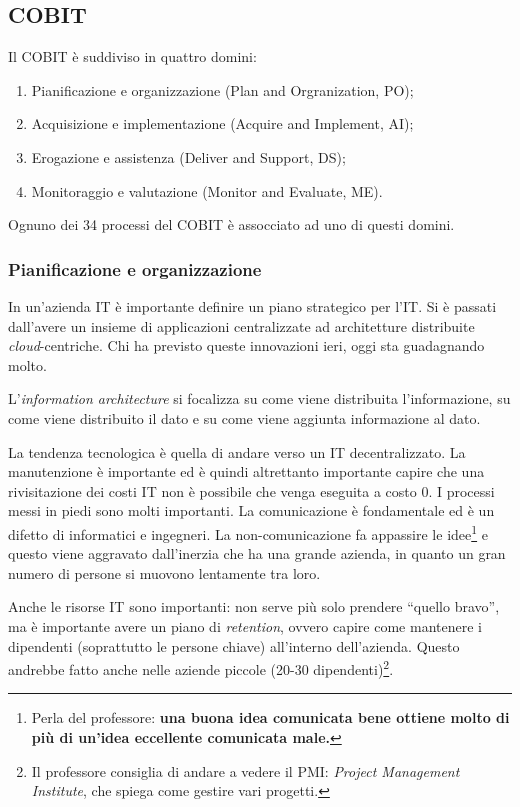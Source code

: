\subsection{COBIT}
\label{COBIT}

Il COBIT è suddiviso in quattro domini:
\begin{enumerate}
  \item Pianificazione e organizzazione (Plan and Orgranization, PO);
  \item Acquisizione e implementazione (Acquire and Implement, AI);
  \item Erogazione e assistenza (Deliver and Support, DS);
  \item Monitoraggio  e valutazione (Monitor and Evaluate, ME).
\end{enumerate}
Ognuno dei 34 processi del COBIT è assocciato ad uno di questi domini.

\subsubsection{Pianificazione e organizzazione}

In un'azienda IT è importante definire un piano strategico per l'IT. Si è 
passati dall'avere un insieme di applicazioni centralizzate ad architetture 
distribuite \textit{cloud}-centriche. Chi ha previsto queste innovazioni ieri, 
oggi sta guadagnando molto.

L'\textit{information architecture} si focalizza su come viene distribuita
l'informazione, su come viene distribuito il dato e su come viene aggiunta
informazione al dato.

La tendenza tecnologica è quella di andare verso un IT decentralizzato. La 
manutenzione è importante ed è quindi altrettanto importante capire che una 
rivisitazione dei costi IT non è possibile che venga eseguita a costo 0. I 
processi messi in piedi sono molti importanti. La comunicazione è fondamentale 
ed è un difetto di informatici e ingegneri. La non-comunicazione fa appassire 
le idee\footnote{Perla del professore: \textbf{una buona idea comunicata bene 
ottiene molto di più di un'idea eccellente comunicata male.}} e questo viene 
aggravato dall'inerzia che ha una grande azienda, in quanto un gran numero di 
persone si muovono lentamente tra loro.

Anche le risorse IT sono importanti: non serve più solo prendere ``quello
bravo'', ma è importante avere un piano di \textit{retention}, ovvero capire
come mantenere i dipendenti (soprattutto le persone chiave) all'interno
dell'azienda. Questo andrebbe fatto anche nelle aziende piccole (20-30
dipendenti)\footnote{Il professore consiglia di andare a vedere il PMI:
\textit{Project Management Institute}, che spiega come gestire vari progetti.}.

